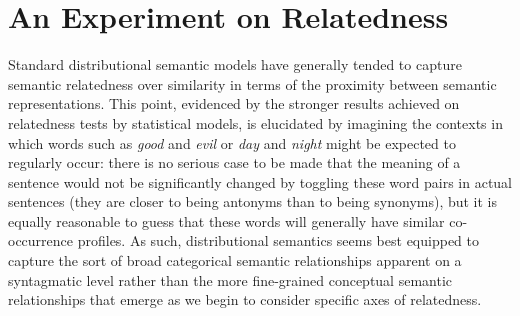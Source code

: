 \section{An Experiment on Relatedness} \label{sec:relperiment}
Standard distributional semantic models have generally tended to capture semantic relatedness over similarity in terms of the proximity between semantic representations.  This point, evidenced by the stronger results achieved on relatedness tests by statistical models, is elucidated by imagining the contexts in which words such as \emph{good} and \emph{evil} or \emph{day} and \emph{night} might be expected to regularly occur: there is no serious case to be made that the meaning of a sentence would not be significantly changed by toggling these word pairs in actual sentences (they are closer to being antonyms than to being synonyms), but it is equally reasonable to guess that these words will generally have similar co-occurrence profiles.  As such, distributional semantics seems best equipped to capture the sort of broad categorical semantic relationships apparent on a syntagmatic level rather than the more fine-grained conceptual semantic relationships that emerge as we begin to consider specific axes of relatedness.

